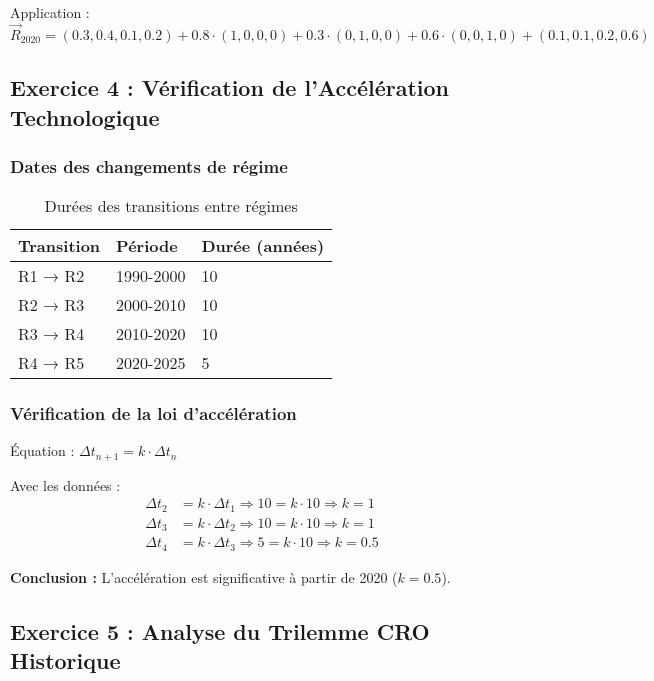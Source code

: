 \documentclass[12pt, a4paper]{article}
\begin{document}
Application :
\[
\vec{R}_{2020} = (0.3, 0.4, 0.1, 0.2) + 0.8 \cdot (1,0,0,0) + 0.3 \cdot (0,1,0,0) + 0.6 \cdot (0,0,1,0) + (0.1, 0.1, 0.2, 0.6)
\]

\subsection*{Exercice 4 : Vérification de l'Accélération Technologique}

\subsubsection*{Dates des changements de régime}

\begin{table}[h]
\centering
\begin{tabular}{lll}
\toprule
Transition & Période & Durée (années) \\
\midrule
R1 → R2 & 1990-2000 & 10 \\
R2 → R3 & 2000-2010 & 10 \\
R3 → R4 & 2010-2020 & 10 \\
R4 → R5 & 2020-2025 & 5 \\
\bottomrule
\end{tabular}
\caption{Durées des transitions entre régimes}
\end{table}

\subsubsection*{Vérification de la loi d'accélération}

Équation : $\Delta t_{n+1} = k \cdot \Delta t_n$

Avec les données :
\begin{align*}
\Delta t_2 &= k \cdot \Delta t_1 \Rightarrow 10 = k \cdot 10 \Rightarrow k = 1 \\
\Delta t_3 &= k \cdot \Delta t_2 \Rightarrow 10 = k \cdot 10 \Rightarrow k = 1 \\
\Delta t_4 &= k \cdot \Delta t_3 \Rightarrow 5 = k \cdot 10 \Rightarrow k = 0.5
\end{align*}

\textbf{Conclusion :} L'accélération est significative à partir de 2020 ($k = 0.5$).

\subsection*{Exercice 5 : Analyse du Trilemme CRO Historique}
\end{document}
